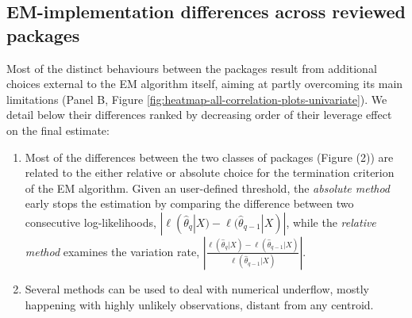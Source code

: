 \hypertarget{em-implementation-differences-across-reviewed-packages}{%
\subsection{EM-implementation differences across reviewed packages}\label{em-implementation-differences-across-reviewed-packages}}

\label{sec:em-differences}

Most of the distinct behaviours between the packages result from additional choices external to the EM algorithm itself, aiming at partly overcoming its main limitations (Panel B, Figure \ref{fig:heatmap-all-correlation-plots-univariate}). We detail below their differences ranked by decreasing order of their leverage effect on the final estimate:

\begin{enumerate}
\def\labelenumi{\arabic{enumi}.}
\tightlist
\item
  Most of the differences between the two classes of packages (Figure (2)) are
  related to the either relative or absolute choice for the termination criterion of the EM algorithm. Given an user-defined threshold, the \emph{absolute method} early stops the estimation by comparing the difference between two consecutive log-likelihoods, \(|\ell(\hat{\theta}_{q}|X) - \ell(\hat{\theta}_{q-1}|X)|\), while the \emph{relative method} examines the variation rate, \(\left\lvert\frac{\ell(\hat{\theta}_{q}|X) - \ell(\hat{\theta}_{q-1}|X)}{\ell(\hat{\theta}_{q-1}|X)}\right\lvert\).
\item
  Several methods can be used to deal with numerical underflow, mostly happening with highly unlikely observations, distant from any centroid.


\end{enumerate}
